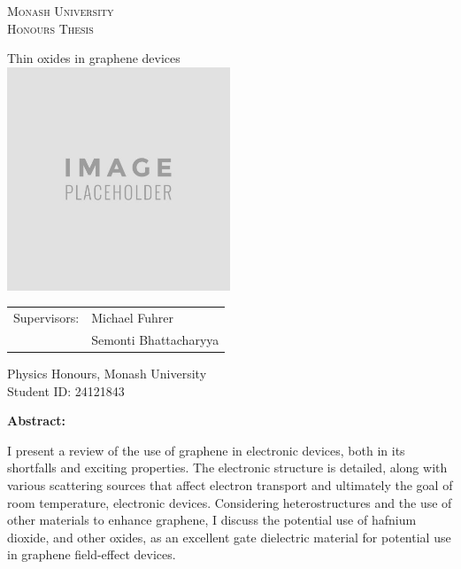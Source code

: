 \documentclass{report}
\title{}
\date{\today}
\author{Matthew Gebert}
\begin{document}
	
	\begin{titlepage}
		\centering
		\scshape\LARGE Monash University\\
		\vspace{5mm}\Large Honours Thesis\\\vspace{1.5cm}
		
		\myTitle Thin oxides in graphene devices\\
		\normalfont\normalsize
		\vspace{5mm}\includegraphics[width=0.5\textwidth]{placeholder.png}
		\vspace{5mm}
		\begin{flushleft}
			\hrulefill
		\end{flushleft}
		\begin{tabularx}{\textwidth}{Xl}
			Supervisors:&Michael Fuhrer\\
			&Semonti Bhattacharyya
		\end{tabularx}\newline
		\begin{flushleft}
			\hrulefill
		\end{flushleft}
		\begin{center}
			Physics Honours, Monash University\\Student ID: 24121843
		\end{center}
		\vspace{3mm}
		
		\begin{center}
			\large\textbf{Abstract:}
		\end{center}
		
		I present a review of the use of graphene in electronic devices, both in its shortfalls and exciting properties. The electronic structure is detailed, along with various scattering sources that affect electron transport and ultimately the goal of room temperature, electronic devices. Considering heterostructures and the use of other materials to enhance graphene, I discuss the potential use of hafnium dioxide, and other oxides, as an excellent gate dielectric material for potential use in graphene field-effect devices.
	
	\end{titlepage}
	
\end{document}
